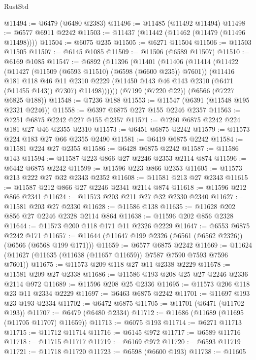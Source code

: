\begin{lexlean}{RustStd}
\begin{coremodule}
@11494 := @6479 (@6480 @2383)
@11496 := @11485 (@11492 @11494)
@11498 := @6577 @6911 @2242
@11503 := @11437 (@11442 (@11462 (@11479 (@11496 @11498))))
@11504 := @6075 @235
@11505 := @6271 @11504
@11506 := @11503 @11505
@11507 := @6145 @1085
@11509 := @11506 (@6589 @11507)
@11510 := @6169 @1085
@11547 := @6892
    (@11396
      (@11401
        (@11406
          (@11414
            (@11422
              (@11427 (@11509 (@6593 @11510) (@6598 (@6600 @235)) @7601))
              (@11416
                @181
                @118
                @46
                @11
                @2310
                @2229
                (@11450 @143 @46 @143 @2310 (@6471 (@11455 @143)) @7307)
                @11498))))))
    (@7199 (@7220 @22))
    (@6566 (@7227 @6825 @188))
@11548 := @7236 @188
@11553 := @11547 (@6391 (@11548 @195 @2321 @2246))
@11558 := @6397 @6875 @227 @155 @2246 @2357
@11563 := @7251 @6875 @2242 @227 @155 @2357
@11571 := @7260 @6875 @2242 @224 @181 @27 @46 @2355 @2310
@11573 := @6451 @6875 @2242
@11579 := @11573 @224 @183 @27 @66 @2355 @2490
@11581 := @6419 @6875 @2242
@11584 := @11581 @224 @27 @2355
@11586 := @6428 @6875 @2242
@11587 := @11586 @143
@11594 := @11587 @223 @866 @27 @2246 @2353 @2114 @874
@11596 := @6442 @6875 @2242
@11599 := @11596 @223 @866 @2353
@11605 := @11573 @213 @222 @27 @32 @2343 @2352
@11608 := @11581 @213 @27 @2343
@11615 := @11587 @212 @866 @27 @2246 @2341 @2114 @874
@11618 := @11596 @212 @866 @2341
@11624 := @11573 @203 @211 @27 @32 @2330 @2340
@11627 := @11581 @203 @27 @2330
@11628 := @11586 @138
@11635 := @11628 @202 @856 @27 @2246 @2328 @2114 @864
@11638 := @11596 @202 @856 @2328
@11644 := @11573 @200 @118 @171 @11 @2326 @2229
@11647 := @6553 @6875 @2242 @171
@11657 := @11644 (@11647 @199 @2326 (@6561 (@6562 @2326)) (@6566 (@6568 @199 @171)))
@11659 := @6577 @6875 @2242
@11669 := @11624 (@11627 (@11635 (@11638 (@11657 @11659)) @7587 @7590 @7593 @7596 @7601))
@11675 := @11573 @209 @118 @27 @11 @2338 @2229
@11678 := @11581 @209 @27 @2338
@11686 := @11586 @193 @208 @25 @27 @2246 @2336 @2114 @972
@11689 := @11596 @208 @25 @2336
@11695 := @11573 @206 @118 @23 @11 @2334 @2229
@11697 := @6463 @6875 @2242
@11701 := @11697 @193 @23 @193 @2334
@11702 := @6472 @6875
@11705 := @11701 (@6471 (@11702 @193))
@11707 := @6479 (@6480 @2334)
@11712 := @11686 (@11689 (@11695 (@11705 @11707) @11659))
@11713 := @6075 @193
@11714 := @6271 @11713
@11715 := @11712 @11714
@11716 := @6145 @972
@11717 := @6589 @11716
@11718 := @11715 @11717
@11719 := @6169 @972
@11720 := @6593 @11719
@11721 := @11718 @11720
@11723 := @6598 (@6600 @193)
@11738 := @11605

\end{coremodule}
\end{lexlean}
